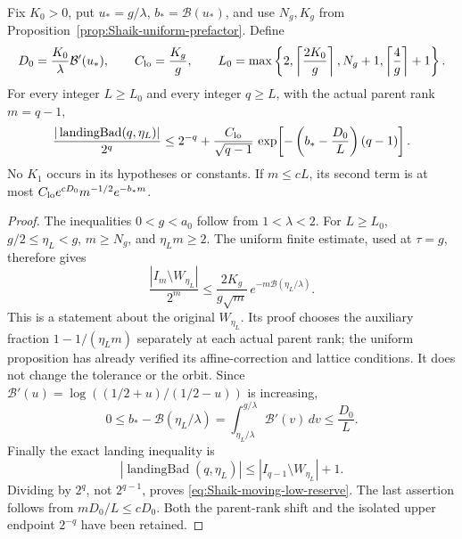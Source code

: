 \begin{proposition}\label{prop:Shaik-moving-low-reserve}
Fix \(K_0>0\), put \(u_*=g/\lambda\), \(b_*=\mathcal B(u_*)\), and use
\(N_g,K_g\) from Proposition~\ref{prop:Shaik-uniform-prefactor}. Define
\[
 D_0=\frac{K_0}{\lambda}\mathcal B'(u_*),\qquad C_{\rm lo}=\frac{K_g}{g},
 \qquad
 L_0=\max\left\{2,\left\lceil\frac{2K_0}{g}\right\rceil,
                    N_g+1,\left\lceil\frac4g\right\rceil+1\right\}.
\]
For every integer \(L\ge L_0\) and every integer \(q\ge L\), with
the actual parent rank \(m=q-1\),
\begin{equation}\label{eq:Shaik-moving-low-reserve}
 \frac{|\operatorname{landingBad}(q,\eta_L)|}{2^q}
 \le 2^{-q}+\frac{C_{\rm lo}}{\sqrt{q-1}}\,
       \exp\!\left[-\left(b_*-\frac{D_0}{L}\right)(q-1)\right].
\end{equation}
No \(K_1\) occurs in its hypotheses or constants.
If \(m\le cL\), its second term is at most
\(C_{\rm lo}e^{cD_0}m^{-1/2}e^{-b_*m}\).
\end{proposition}
\begin{proof}
The inequalities \(0<g<a_0\) follow from \(1<\lambda<2\).
For \(L\ge L_0\),
\(g/2\le\eta_L<g\), \(m\ge N_g\), and \(\eta_Lm\ge2\).
The uniform finite estimate, used at \(\tau=g\), therefore gives
\[
 \frac{|I_m\setminus W_{\eta_L}|}{2^m}
 \le \frac{2K_g}{g\sqrt m}\,
           e^{-m\mathcal B(\eta_L/\lambda)}.
\]
This is a statement about the original \(W_{\eta_L}\).
Its proof chooses the auxiliary fraction
\(1-1/(\eta_Lm)\) separately at each actual parent rank;
the uniform proposition has already verified its affine-correction
and lattice conditions. It does not change the tolerance or the orbit.
Since
\(\mathcal B'(u)=\log((1/2+u)/(1/2-u))\) is increasing,
\[
 0\le b_*-\mathcal B(\eta_L/\lambda)
   =\int_{\eta_L/\lambda}^{g/\lambda}\mathcal B'(v)\,dv
   \le\frac{D_0}{L}.
\]
Finally the exact landing inequality is
\[
 |\operatorname{landingBad}(q,\eta_L)|
       \le |I_{q-1}\setminus W_{\eta_L}|+1 .
\]
Dividing by \(2^q\), not \(2^{q-1}\), proves
\eqref{eq:Shaik-moving-low-reserve}. The last assertion follows
from \(mD_0/L\le cD_0\). Both the parent-rank shift and the isolated
upper endpoint \(2^{-q}\) have been retained.
\end{proof}

